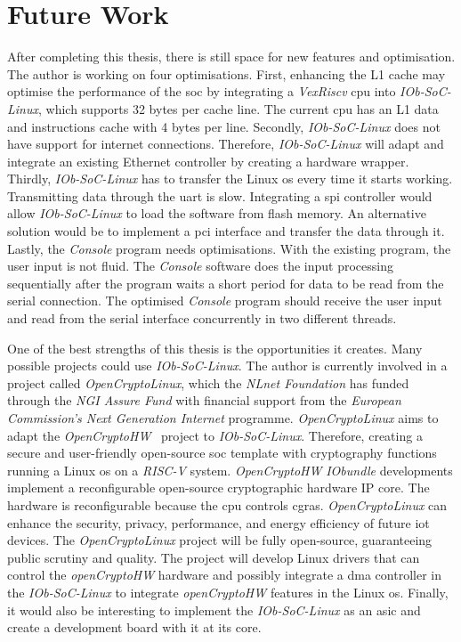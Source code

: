 \section{Future Work}
\label{section:future}
After completing this thesis, there is still space for new features and optimisation. The author is working on four optimisations. First, enhancing the L1 cache may optimise the performance of the \acrshort{soc} by integrating a \textit{VexRiscv} \acrshort{cpu} into \textit{IOb-SoC-Linux}, which supports 32 bytes per cache line. The current \acrshort{cpu} has an L1 data and instructions cache with 4 bytes per line. Secondly, \textit{IOb-SoC-Linux} does not have support for internet connections. Therefore, \textit{IOb-SoC-Linux} will adapt and integrate an existing Ethernet controller by creating a hardware wrapper. Thirdly, \textit{IOb-SoC-Linux} has to transfer the Linux \acrshort{os} every time it starts working. Transmitting data through the \acrshort{uart} is slow. Integrating a \acrfull{spi} controller would allow \textit{IOb-SoC-Linux} to load the software from flash memory. An alternative solution would be to implement a \acrshort{pci} interface and transfer the data through it. Lastly, the \textit{Console} program needs optimisations. With the existing program, the user input is not fluid. The \textit{Console} software does the input processing sequentially after the program waits a short period for data to be read from the serial connection. The optimised \textit{Console} program should receive the user input and read from the serial interface concurrently in two different threads.

One of the best strengths of this thesis is the opportunities it creates. Many possible projects could use \textit{IOb-SoC-Linux}. The author is currently involved in a project called \textit{OpenCryptoLinux}, which the \textit{NLnet Foundation} has funded through the \textit{NGI Assure Fund} with financial support from the \textit{European Commission's Next Generation Internet} programme. \textit{OpenCryptoLinux} aims to adapt the \textit{OpenCryptoHW}~\cite{open_crypto_hw} project to \textit{IOb-SoC-Linux}. Therefore, creating a secure and user-friendly open-source \acrshort{soc} template with cryptography functions running a Linux \acrshort{os} on a \textit{RISC-V} system. \textit{OpenCryptoHW} \textit{IObundle} developments implement a reconfigurable open-source cryptographic hardware IP core. The hardware is reconfigurable because the \acrshort{cpu} controls \acrfull{cgras}. \textit{OpenCryptoLinux} can enhance the security, privacy, performance, and energy efficiency of future \acrfull{iot} devices. The \textit{OpenCryptoLinux} project will be fully open-source, guaranteeing public scrutiny and quality. The project will develop Linux drivers that can control the \textit{openCryptoHW} hardware and possibly integrate a \acrshort{dma} controller in the \textit{IOb-SoC-Linux} to integrate \textit{openCryptoHW} features in the Linux \acrshort{os}. Finally, it would also be interesting to implement the \textit{IOb-SoC-Linux} as an \acrshort{asic} and create a development board with it at its core.
